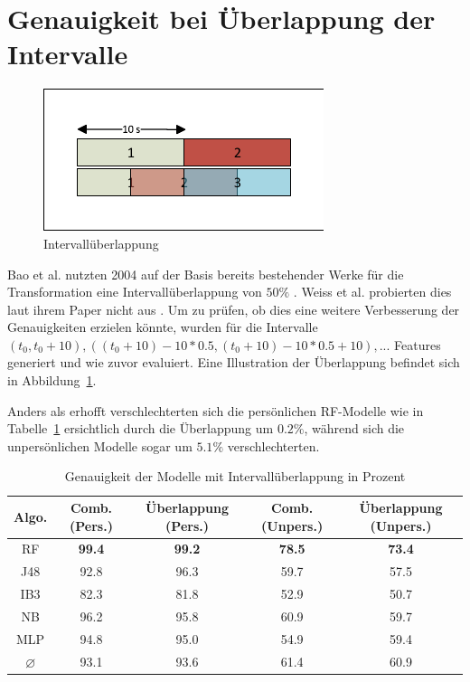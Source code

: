 \section{Genauigkeit bei Überlappung der Intervalle}
\begin{figure}[htb]
\centering
\includegraphics[clip=true, trim=5mm 5mm 5mm 5mm]{img/interval_overlap}
\caption{Intervallüberlappung}
\label{fig:interval-overlap}
\end{figure}

Bao et al. nutzten 2004 auf der Basis bereits bestehender Werke für die Transformation eine Intervallüberlappung von $50 \%$ \cite{Bao2004}. Weiss et al. probierten dies laut ihrem Paper nicht aus \cite{Weiss2016}. Um zu prüfen, ob dies eine weitere Verbesserung der Genauigkeiten erzielen könnte, wurden für die Intervalle $(t_0, t_0 + 10), ((t_0 + 10) - 10 * 0.5, (t_0 + 10) - 10 * 0.5 + 10), ...$ Features generiert und wie zuvor evaluiert. Eine Illustration der Überlappung befindet sich in Abbildung~\ref{fig:interval-overlap}.

Anders als erhofft verschlechterten sich die persönlichen RF-Modelle wie in Tabelle~\ref{tab:accuracy-overlap} ersichtlich durch die Überlappung um $0.2 \%$, während sich die unpersönlichen Modelle sogar um $5.1 \%$ verschlechterten.

\begin{table}
\centering
\begin{tabular}{|c|c|c||c|c|}
	\hline 
	\textbf{Algo.} & \textbf{Comb. (Pers.)} & \textbf{Überlappung (Pers.)} &\textbf{Comb. (Unpers.)} & \textbf{Überlappung (Unpers.)} \\ 
	\hline 
	RF & \textbf{99.4} & \textbf{99.2} & \textbf{78.5} & \textbf{73.4} \\ 
	J48 & 92.8 & 96.3 & 59.7 & 57.5 \\ 
	IB3 & 82.3 & 81.8 & 52.9 & 50.7 \\ 
	NB & 96.2 & 95.8 & 60.9 & 59.7 \\ 
	MLP & 94.8 & 95.0 & 54.9 & 59.4 \\ 
	\hline 
	$\varnothing$ & 93.1 & 93.6 & 61.4 & 60.9 \\ 
	\hline
\end{tabular} 
\caption{Genauigkeit der Modelle mit Intervallüberlappung in Prozent}
\label{tab:accuracy-overlap}
\end{table}

